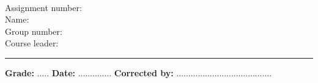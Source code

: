 \thispagestyle{empty}

\textbf{\large\course\ \coursename}

\begin{description}
\item[Assignment number:] \assignmentnr
\item[Name:] \theauthor
\item[Group number:] \groupnr
\item[Course leader:] \courseleader
\end{description}

\rule[0.5ex]{1\columnwidth}{1pt}

\textbf{Grade:} ..... \hfill \textbf{Date:} .............. \hfill \textbf{Corrected
 by:} ........................................
